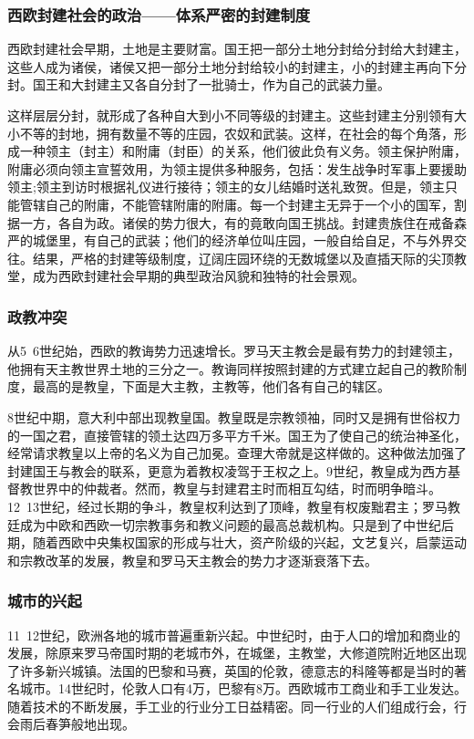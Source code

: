 \subsubsection{西欧封建社会的政治——体系严密的封建制度}
西欧封建社会早期，土地是主要财富。国王把一部分土地分封给分封给大封建主，这些人成为诸侯，诸侯又把一部分土地分封给较小的封建主，小的封建主再向下分封。国王和大封建主又各自分封了一批骑士，作为自己的武装力量。

这样层层分封，就形成了各种自大到小不同等级的封建主。这些封建主分别领有大小不等的封地，拥有数量不等的庄园，农奴和武装。这样，在社会的每个角落，形成一种领主（封主）和附庸（封臣）的关系，他们彼此负有义务。领主保护附庸，附庸必须向领主宣誓效用，为领主提供多种服务，包括：发生战争时军事上要援助领主;领主到访时根据礼仪进行接待；领主的女儿结婚时送礼致贺。但是，领主只能管辖自己的附庸，不能管辖附庸的附庸。每一个封建主无异于一个小的国军，割据一方，各自为政。诸侯的势力很大，有的竟敢向国王挑战。封建贵族住在戒备森严的城堡里，有自己的武装；他们的经济单位叫庄园，一般自给自足，不与外界交往。结果，严格的封建等级制度，辽阔庄园环绕的无数城堡以及直插天际的尖顶教堂，成为西欧封建社会早期的典型政治风貌和独特的社会景观。

\subsubsection{政教冲突}
从5~6世纪始，西欧的教诲势力迅速增长。罗马天主教会是最有势力的封建领主，他拥有天主教世界土地的三分之一。教诲同样按照封建的方式建立起自己的教阶制度，最高的是教皇，下面是大主教，主教等，他们各有自己的辖区。

8世纪中期，意大利中部出现教皇国。教皇既是宗教领袖，同时又是拥有世俗权力的一国之君，直接管辖的领土达四万多平方千米。国王为了使自己的统治神圣化，经常请求教皇以上帝的名义为自己加冕。查理大帝就是这样做的。这种做法加强了封建国王与教会的联系，更意为着教权凌驾于王权之上。9世纪，教皇成为西方基督教世界中的仲裁者。然而，教皇与封建君主时而相互勾结，时而明争暗斗。12~13世纪，经过长期的争斗，教皇权利达到了顶峰，教皇有权废黜君主；罗马教廷成为中欧和西欧一切宗教事务和教义问题的最高总裁机构。只是到了中世纪后期，随着西欧中央集权国家的形成与壮大，资产阶级的兴起，文艺复兴，启蒙运动和宗教改革的发展，教皇和罗马天主教会的势力才逐渐衰落下去。

\subsubsection{城市的兴起}
11~12世纪，欧洲各地的城市普遍重新兴起。中世纪时，由于人口的增加和商业的发展，除原来罗马帝国时期的老城市外，在城堡，主教堂，大修道院附近地区出现了许多新兴城镇。法国的巴黎和马赛，英国的伦敦，德意志的科隆等都是当时的著名城市。14世纪时，伦敦人口有4万，巴黎有8万。西欧城市工商业和手工业发达。随着技术的不断发展，手工业的行业分工日益精密。同一行业的人们组成行会，行会雨后春笋般地出现。

